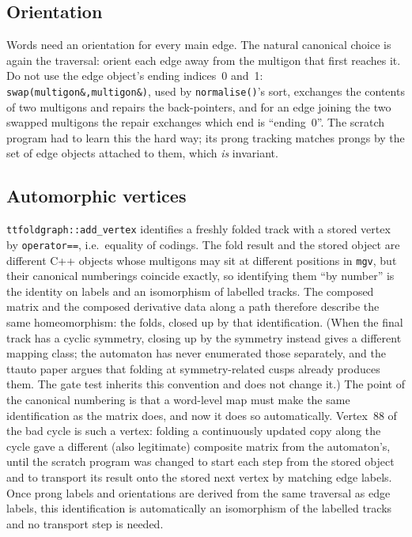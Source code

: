 \documentclass[12pt]{amsart}
\newcommand{\code}[1]{\texttt{#1}}
\theoremstyle{plain}
\theoremstyle{definition}
\begin{document}
\subsection*{Orientation}
Words need an orientation for every main edge.  The natural canonical
choice is again the traversal: orient each edge away from the multigon
that first reaches it.  Do not use the edge object's ending indices~0 and~1:
\code{swap(multigon\&,multigon\&)}, used by \code{normalise()}'s sort,
exchanges the contents of two multigons and repairs the back-pointers, and
for an edge joining the two swapped multigons the repair exchanges which
end is ``ending~0''.  The scratch program had to learn this the hard way;
its prong tracking matches prongs by the set of edge objects attached to
them, which \emph{is} invariant.

\subsection*{Automorphic vertices}
\code{ttfoldgraph::add\_vertex} identifies a freshly folded track with a
stored vertex by \code{operator==}, i.e.\ equality of codings.  The fold
result and the stored object are different C++ objects whose multigons
may sit at different positions in \code{mgv}, but their canonical
numberings coincide exactly, so identifying them ``by number'' is the
identity on labels and an isomorphism of labelled tracks.  The composed
matrix and the composed derivative data along a path therefore describe
the same homeomorphism: the folds, closed up by that identification.
(When the final track has a cyclic symmetry, closing up by the symmetry
instead gives a different mapping class; the automaton has never
enumerated those separately, and the ttauto paper argues that folding at
symmetry-related cusps already produces them.  The gate test inherits this
convention and does not change it.)  The point of the canonical numbering
is that a word-level map must make the same identification as the matrix
does, and now it does so automatically.  Vertex~88 of the bad cycle is such a
vertex: folding a continuously updated copy along the cycle gave a
different (also legitimate) composite matrix from the automaton's, until
the scratch program was changed to start each step from the stored object
and to transport its result onto the stored next vertex by matching edge
labels.  Once prong labels and orientations are derived from the same
traversal as edge labels, this identification is automatically an
isomorphism of the labelled tracks and no transport step is needed.
\end{document}
